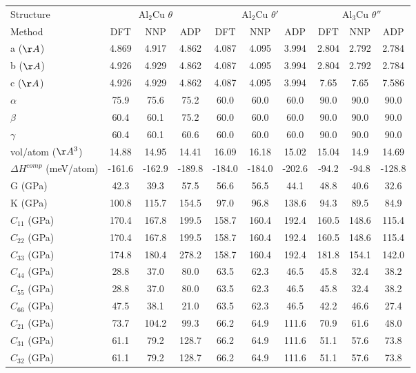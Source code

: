 \documentclass{article}
\begin{document}
\begin{tabular}{l|ccc|ccc|ccc}%
\hline%
Structure&\multicolumn{3}{c}{Al$_2$Cu  $\theta$}&\multicolumn{3}{c}{Al$_2$Cu $\theta'$}&\multicolumn{3}{c}{Al$_3$Cu $\theta''$}\\%
Method&DFT&NNP&ADP&DFT&NNP&ADP&DFT&NNP&ADP\\%
\hline%
a ($\AA$)&4.869&4.917&4.862&4.087&4.095&3.994&2.804&2.792&2.784\\%
b ($\AA$)&4.926&4.929&4.862&4.087&4.095&3.994&2.804&2.792&2.784\\%
c ($\AA$)&4.926&4.929&4.862&4.087&4.095&3.994&7.65&7.65&7.586\\%
$\alpha$&75.9&75.6&75.2&60.0&60.0&60.0&90.0&90.0&90.0\\%
$\beta$&60.4&60.1&75.2&60.0&60.0&60.0&90.0&90.0&90.0\\%
$\gamma$&60.4&60.1&60.6&60.0&60.0&60.0&90.0&90.0&90.0\\%
vol/atom ($\AA^3$)&14.88&14.95&14.41&16.09&16.18&15.02&15.04&14.9&14.69\\%
$\Delta$$H^{comp}$ (meV/atom)&{-}161.6&{-}162.9&{-}189.8&{-}184.0&{-}184.0&{-}202.6&{-}94.2&{-}94.8&{-}128.8\\%
G (GPa)&42.3&39.3&57.5&56.6&56.5&44.1&48.8&40.6&32.6\\%
K (GPa)&100.8&115.7&154.5&97.0&96.8&138.6&94.3&89.5&84.9\\%
$C_{11}$ (GPa)&170.4&167.8&199.5&158.7&160.4&192.4&160.5&148.6&115.4\\%
$C_{22}$ (GPa)&170.4&167.8&199.5&158.7&160.4&192.4&160.5&148.6&115.4\\%
$C_{33}$ (GPa)&174.8&180.4&278.2&158.7&160.4&192.4&181.8&154.1&142.0\\%
$C_{44}$ (GPa)&28.8&37.0&80.0&63.5&62.3&46.5&45.8&32.4&38.2\\%
$C_{55}$ (GPa)&28.8&37.0&80.0&63.5&62.3&46.5&45.8&32.4&38.2\\%
$C_{66}$ (GPa)&47.5&38.1&21.0&63.5&62.3&46.5&42.2&46.6&27.4\\%
$C_{21}$ (GPa)&73.7&104.2&99.3&66.2&64.9&111.6&70.9&61.6&48.0\\%
$C_{31}$ (GPa)&61.1&79.2&128.7&66.2&64.9&111.6&51.1&57.6&73.8\\%
$C_{32}$ (GPa)&61.1&79.2&128.7&66.2&64.9&111.6&51.1&57.6&73.8\\%
\hline%
\end{tabular}%
\end{document}
